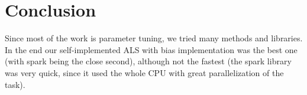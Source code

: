 \documentclass[a4paper]{article}
\begin{document}
\section{Conclusion}
Since most of the work is parameter tuning, we tried many methods and libraries. In the end our self-implemented ALS with bias implementation was the best one (with spark being the close second), although not the fastest (the spark library was very quick, since it used the whole CPU with great parallelization of the task). 
\end{document}

